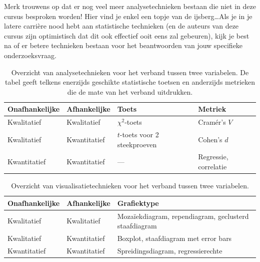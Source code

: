 Merk trouwens op dat er nog veel meer analysetechnieken bestaan die niet in deze cursus besproken worden! Hier vind je enkel een topje van de ijsberg\ldots Als je in je latere carrière nood hebt aan statistische technieken (en de auteurs van deze cursus zijn optimistisch dat dit ook effectief ooit eens zal gebeuren), kijk je best na of er betere technieken bestaan voor het beantwoorden van jouw specifieke onderzoeksvraag.

\begin{table}
  \begin{tabular}{llll}
    \toprule
    \textbf{Onafhankelijke} & \textbf{Afhankelijke} & \textbf{Toets}                & \textbf{Metriek}      \\
    \midrule
    Kwalitatief             & Kwalitatief           & $\chi^2$-toets                & Cramér's $V$          \\
    Kwalitatief             & Kwantitatief          & $t$-toets voor 2 steekproeven & Cohen's $d$           \\
    Kwantitatief            & Kwantitatief          & ---                           & Regressie, correlatie \\
    \bottomrule
  \end{tabular}
  \caption{Overzicht van analysetechnieken voor het verband tussen twee variabelen. De tabel geeft telkens enerzijds geschikte statistische toetsen en anderzijds metrieken die de mate van het verband uitdrukken.}
  \label{tab:analyse2var}
\end{table}

\begin{table}
  \begin{tabular}{lll}
  	\toprule
  	\textbf{Onafhankelijke} & \textbf{Afhankelijke} & \textbf{Grafiektype}                                  \\
  	\midrule
  	Kwalitatief             & Kwalitatief           & Mozaïekdiagram, rependiagram, geclusterd staafdiagram \\
  	Kwalitatief             & Kwantitatief          & Boxplot, staafdiagram met error bars                  \\
  	Kwantitatief            & Kwantitatief          & Spreidingsdiagram, regressierechte                    \\
  	\bottomrule
  \end{tabular}
  \caption{Overzicht van visualisatietechnieken voor het verband tussen twee variabelen.}
  \label{tab:visualisatie2var}
\end{table}

